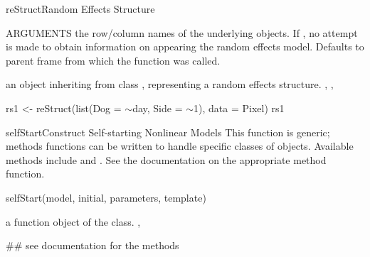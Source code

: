 \documentclass[pdftex]{article} \usepackage{url,graphicx}
\renewcommand{\Twiddle}{\mbox{\(\sim\)}}
\begin{document}
\begin{Helpfile}{reStruct}{Random Effects Structure}
\begin{Argument}{ARGUMENTS}
the row/column names of the underlying  objects. If
, no attempt is made to obtain information on
 appearing the random effects model. Defaults to parent
frame from which the function was called.
\end{Argument}
an object inheriting from class , representing a random
effects structure.
, ,
\need 15pt
\vspace{-16pt} 
\begin{Example}
rs1 <- reStruct(list(Dog = \Twiddle day, Side = \Twiddle 1), data = Pixel)
rs1
\end{Example}
\end{Helpfile}
\begin{Helpfile}{selfStart}{Construct Self-starting Nonlinear Models}
This function is generic; methods functions can be written to handle
specific classes of objects. Available methods include
 and .
See the documentation on the appropriate method function.
\begin{Example}
selfStart(model, initial, parameters, template)
\end{Example}
a function object of the  class.
, 
\vspace{-16pt} 
\begin{Example}
## see documentation for the methods
\end{Example}
\end{Helpfile}
\end{document}
